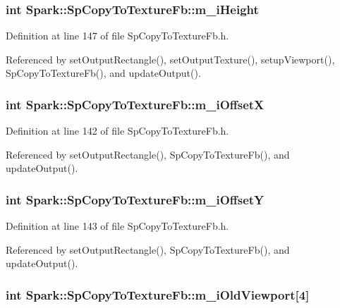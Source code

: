 \subsubsection{\setlength{\rightskip}{0pt plus 5cm}int {\bf Spark::Sp\-Copy\-To\-Texture\-Fb::m\_\-i\-Height}\hspace{0.3cm}{\tt  [protected]}}\label{classSpark_1_1SpCopyToTextureFb_p7}


Definition at line 147 of file Sp\-Copy\-To\-Texture\-Fb.h.

Referenced by set\-Output\-Rectangle(), set\-Output\-Texture(), setup\-Viewport(), Sp\-Copy\-To\-Texture\-Fb(), and update\-Output().
\subsubsection{\setlength{\rightskip}{0pt plus 5cm}int {\bf Spark::Sp\-Copy\-To\-Texture\-Fb::m\_\-i\-Offset\-X}\hspace{0.3cm}{\tt  [protected]}}\label{classSpark_1_1SpCopyToTextureFb_p2}


Definition at line 142 of file Sp\-Copy\-To\-Texture\-Fb.h.

Referenced by set\-Output\-Rectangle(), Sp\-Copy\-To\-Texture\-Fb(), and update\-Output().
\subsubsection{\setlength{\rightskip}{0pt plus 5cm}int {\bf Spark::Sp\-Copy\-To\-Texture\-Fb::m\_\-i\-Offset\-Y}\hspace{0.3cm}{\tt  [protected]}}\label{classSpark_1_1SpCopyToTextureFb_p3}


Definition at line 143 of file Sp\-Copy\-To\-Texture\-Fb.h.

Referenced by set\-Output\-Rectangle(), Sp\-Copy\-To\-Texture\-Fb(), and update\-Output().
\subsubsection{\setlength{\rightskip}{0pt plus 5cm}int {\bf Spark::Sp\-Copy\-To\-Texture\-Fb::m\_\-i\-Old\-Viewport}[4]\hspace{0.3cm}{\tt  [protected]}}\label{classSpark_1_1SpCopyToTextureFb_p8}


